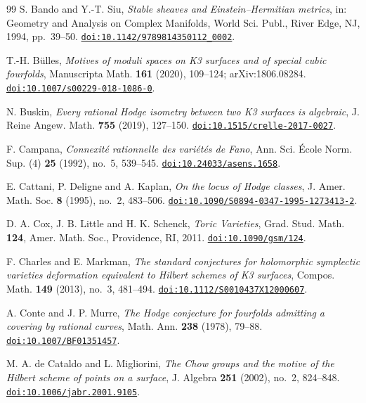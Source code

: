 \begin{thebibliography}{99}
S. Bando and Y.-T. Siu,
\emph{Stable sheaves and Einstein--Hermitian metrics},
in: Geometry and Analysis on Complex Manifolds,
World Sci. Publ., River Edge, NJ, 1994, pp.~39--50.
\href{https://doi.org/10.1142/9789814350112_0002}{\texttt{doi:10.1142/9789814350112\_0002}}.

T.-H. B\"ulles,
\emph{Motives of moduli spaces on K3 surfaces and of special cubic
fourfolds},
Manuscripta Math. \textbf{161} (2020), 109--124; arXiv:1806.08284.
\href{https://doi.org/10.1007/s00229-018-1086-0}{\texttt{doi:10.1007/s00229-018-1086-0}}.

N. Buskin,
\emph{Every rational Hodge isometry between two K3 surfaces is algebraic},
J. Reine Angew. Math. \textbf{755} (2019), 127--150.
\href{https://doi.org/10.1515/crelle-2017-0027}{\texttt{doi:10.1515/crelle-2017-0027}}.

F. Campana,
\emph{Connexit\'e rationnelle des vari\'et\'es de Fano},
Ann. Sci. \'Ecole Norm. Sup. (4) \textbf{25} (1992), no.~5, 539--545.
\href{https://doi.org/10.24033/asens.1658}{\texttt{doi:10.24033/asens.1658}}.

E. Cattani, P. Deligne and A. Kaplan,
\emph{On the locus of Hodge classes},
J. Amer. Math. Soc. \textbf{8} (1995), no.~2, 483--506.
\href{https://doi.org/10.1090/S0894-0347-1995-1273413-2}{\texttt{doi:10.1090/S0894-0347-1995-1273413-2}}.

D. A. Cox, J. B. Little and H. K. Schenck,
\emph{Toric Varieties},
Grad. Stud. Math. \textbf{124}, Amer. Math. Soc., Providence, RI, 2011.
\href{https://doi.org/10.1090/gsm/124}{\texttt{doi:10.1090/gsm/124}}.

F. Charles and E. Markman,
\emph{The standard conjectures for holomorphic symplectic varieties
deformation equivalent to Hilbert schemes of K3 surfaces},
Compos. Math. \textbf{149} (2013), no.~3, 481--494.
\href{https://doi.org/10.1112/S0010437X12000607}{\texttt{doi:10.1112/S0010437X12000607}}.

A. Conte and J. P. Murre,
\emph{The Hodge conjecture for fourfolds admitting a covering by rational
curves},
Math. Ann. \textbf{238} (1978), 79--88.
\href{https://doi.org/10.1007/BF01351457}{\texttt{doi:10.1007/BF01351457}}.

M. A. de Cataldo and L. Migliorini,
\emph{The Chow groups and the motive of the Hilbert scheme of points on a
surface},
J. Algebra \textbf{251} (2002), no.~2, 824--848.
\href{https://doi.org/10.1006/jabr.2001.9105}{\texttt{doi:10.1006/jabr.2001.9105}}.


\end{thebibliography}
